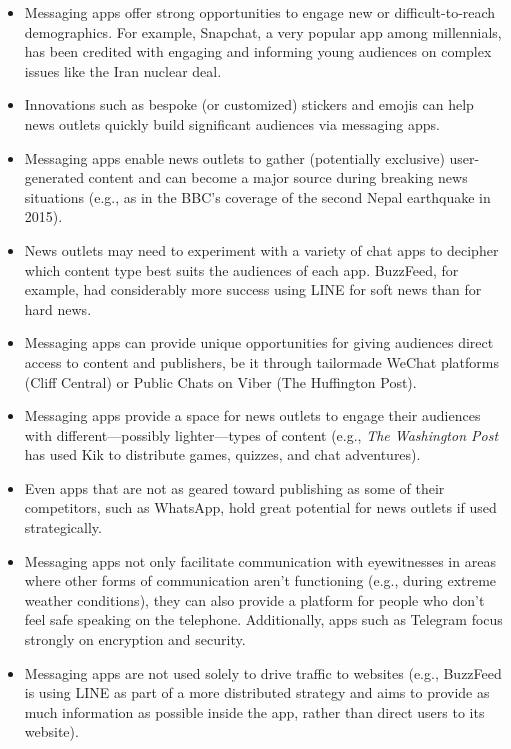 \documentclass[notoc, symmetric, nobib, nols]{towcenter-guideto-book}
\begin{document}
\begin{itemize}[itemsep=.5em]
\item Messaging apps offer strong opportunities to engage new or difficult-to-reach demographics. For example, Snapchat, a very popular app among millennials, has been credited with engaging and informing young audiences on complex issues like the Iran nuclear deal.

\item Innovations such as bespoke (or customized) stickers and emojis can help news outlets quickly build significant audiences via messaging apps.

\item Messaging apps enable news outlets to gather (potentially exclusive) user-generated content and can become a major source during breaking news situations (e.g., as in the BBC's coverage of the second Nepal earthquake in 2015).

\item News outlets may need to experiment with a variety of chat apps to decipher which content type best suits the audiences of each app. BuzzFeed, for example, had considerably more success using LINE for soft news than for hard news.

\item Messaging apps can provide unique opportunities for giving audiences direct access to content and publishers, be it through tailormade WeChat platforms (Cliff Central) or Public Chats on Viber (The Huffington Post).

\item Messaging apps provide a space for news outlets to engage their audiences with different---possibly lighter---types of content (e.g., \textit{The Washington Post} has used Kik to distribute games, quizzes, and chat adventures).

\item Even apps that are not as geared toward publishing as some of their competitors, such as WhatsApp, hold great potential for news outlets if used strategically.

\item Messaging apps not only facilitate communication with eyewitnesses in areas where other forms of communication aren't functioning (e.g., during extreme weather conditions), they can also provide a platform for people who don't feel safe speaking on the telephone. Additionally, apps such as Telegram focus strongly on encryption and security.

\item Messaging apps are not used solely to drive traffic to websites (e.g., BuzzFeed is using LINE as part of a more distributed strategy and aims to provide as much information as possible inside the app, rather than direct users to its website).


\end{itemize}
\end{document}
